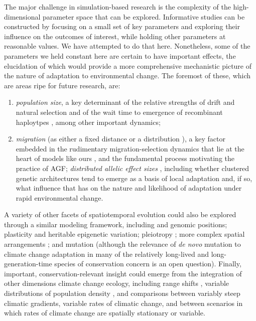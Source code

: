 \documentclass[9pt,twocolumn,twoside,lineno]{pnas-new}
\begin{document}
The major challenge in simulation-based research is the complexity of the high-dimensional 
parameter space that can be explored. Informative studies can be constructed by focusing on a 
small set of key parameters and exploring their influence
on the outcomes of interest, while holding other parameters at reasonable values. We have 
attempted to do that here. Nonetheless, some of the parameters we held constant here are certain 
to have important effects, the elucidation of which would provide a more comprehensive 
mechanistic picture of the nature of adaptation to environmental change. The foremost of these, 
which are areas ripe for future research, are:
    \begin{enumerate}
        \item \textit{population size}, a key determinant of the relative strengths of drift and natural selection \cite{murray} and of the wait time to emergence of recombinant haploytpes \cite{christiansen}, among other important dynamics;
        \item \textit{migration} (as either a fixed distance or a distribution \cite{paulose}), a key factor embedded in the rudimentary migration-selection dynamics that lie at the heart of models like ours \cite{wright,haldane,barton}, and the fundamental process motivating the practice of AGF;
        \itm \textit{distributed allelic effect sizes} \cite{orr}, including whether clustered genetic architectures tend to emerge as a basis of local adaptation \cite{yeaman_whitlock} and, if so, what influence that has on the nature and likelihood of adaptation under rapid environmental change.
    \end{enumerate}
A variety of other facets of spatiotemporal evolution could also be explored 
through a similar modeling framework, including and genomic positions; plasticity \cite{chevin} and 
heritable epigenetic variation; pleiotropy \cite{thompson}; more complex spatial 
arrangements \cite{benes}; and mutation (although the relevance of \textit{de 
novo} mutation to climate change adaptation in many of the relatively long-lived 
and long-generation-time species of conservation concern is an open question).
Finally, important, conservation-relevant insight could emerge from the 
integration of other dimensions climate change ecology, including range shifts 
\cite{weiss-lehman}, variable distributions of population density 
\cite{aitken_whitlock}, and comparisons between variably steep climatic 
gradients, variable rates of climatic change, and between scenarios in which 
rates of climate change are spatially stationary or variable. 
\end{document}
